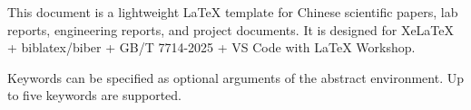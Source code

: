 \begin{cqtenabstract}
This document is a lightweight LaTeX template for Chinese scientific papers, lab reports,
engineering reports, and project documents. It is designed for XeLaTeX + biblatex/biber +
GB/T 7714-2025 + VS Code with LaTeX Workshop.

Keywords can be specified as optional arguments of the abstract environment. Up to five keywords are supported.
\end{cqtenabstract}
